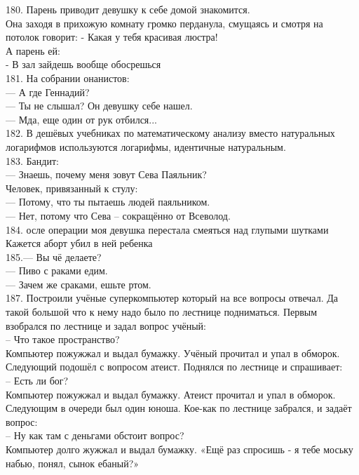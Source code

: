 \documentclass[a4paper,20pt,notitlepage]{extbook}
\begin{document}
	180. Парень приводит девушку к себе домой знакомится.\\
	Она заходя в прихожую комнату громко перданула, смущаясь и смотря на потолок говорит:
	- Какая у тебя красивая люстра!\\
	А парень ей:\\
	- В зал зайдешь вообще обосрешься\\
	
	181. На собрании онанистов: \\
	
	— А где Геннадий?\\
	— Ты не слышал? Он девушку себе нашел.\\
	— Мда, еще один от рук отбился...\\
	
	182. В дешёвых учебниках по математическому анализу вместо натуральных логарифмов используются логарифмы, идентичные натуральным.\\
	
	183. Бандит:\\
	— Знаешь, почему меня зовут Сева Паяльник?\\
	Человек, привязанный к стулу:\\
	— Потому, что ты пытаешь людей паяльником.\\
	— Нет, потому что Сева – сокращённо от Всеволод.\\
	
	184. осле операции моя девушка перестала смеяться над глупыми шутками\\
	Кажется аборт убил в ней ребенка\\
	
	185.— Вы чё делаете?\\
	— Пиво с раками едим.\\
	— Зачем же сраками, ешьте ртом. \\
	
	187. Построили учёные суперкомпьютер который на все вопросы отвечал. Да такой большой что к нему надо было по лестнице подниматься. Первым взобрался по лестнице и задал вопрос учёный:\\
	– Что такое пространство?\\
	Компьютер пожужжал и выдал бумажку. Учёный прочитал и упал в обморок. Следующий подошёл с вопросом атеист. Поднялся по лестнице и спрашивает:\\
	– Есть ли бог?\\
	Компьютер пожужжал и выдал бумажку. Атеист прочитал и упал в обморок. Следующим в очереди был один юноша. Кое-как по лестнице забрался, и задаёт вопрос:\\
	– Ну как там с деньгами обстоит вопрос?\\
	Компьютер долго жужжал и выдал бумажку. «Ещё раз спросишь - я тебе моську набью, понял, сынок ебаный?»\\
	
\end{document}
